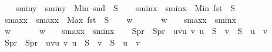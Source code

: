 \begin{isabellebody}
\isanewline
\ \ \isamarkupfalse%
\ s{}{\isacharunderscore}{\kern0pt}miny\ \ {\isachardoublequoteopen}s{}{\isacharunderscore}{\kern0pt}miny\ {\isacharequal}{\kern0pt}\ Min\ {\isacharparenleft}{\kern0pt}snd\ {\isacharbackquote}{\kern0pt}\ S{}{\isacharparenright}{\kern0pt}{\isachardoublequoteclose}\isanewline
\ \ \isamarkupfalse%
\ s{}{\isacharunderscore}{\kern0pt}minx\ \ {\isachardoublequoteopen}s{}{\isacharunderscore}{\kern0pt}minx\ {\isacharequal}{\kern0pt}\ Min\ {\isacharparenleft}{\kern0pt}fst\ {\isacharbackquote}{\kern0pt}\ S{}{\isacharparenright}{\kern0pt}{\isachardoublequoteclose}\isanewline
\ \ \isamarkupfalse%
\ s{}{\isacharunderscore}{\kern0pt}maxx\ \ {\isachardoublequoteopen}s{}{\isacharunderscore}{\kern0pt}maxx\ {\isacharequal}{\kern0pt}\ Max\ {\isacharparenleft}{\kern0pt}fst\ {\isacharbackquote}{\kern0pt}\ S{}{\isacharparenright}{\kern0pt}{\isachardoublequoteclose}\isanewline
\ \ \isamarkupfalse%
\ w{}\ \ \ \ \ \ \ {\isachardoublequoteopen}w{}\ \ \ {\isacharequal}{\kern0pt}\ s{}{\isacharunderscore}{\kern0pt}maxx\ {\isacharminus}{\kern0pt}\ s{}{\isacharunderscore}{\kern0pt}minx{\isachardoublequoteclose}\isanewline
\ \ \isamarkupfalse%
\ w{}\ \ \ \ \ \ \ {\isachardoublequoteopen}w{}\ \ \ {\isacharequal}{\kern0pt}\ s{}{\isacharunderscore}{\kern0pt}maxx\ {\isacharminus}{\kern0pt}\ s{}{\isacharunderscore}{\kern0pt}minx{\isachardoublequoteclose}\isanewline
\isanewline
\ \ \isamarkupfalse%
\ S{}pr\ \ {\isachardoublequoteopen}S{}pr\ {\isacharequal}{\kern0pt}\ {\isacharbraceleft}{\kern0pt}{\isacharparenleft}{\kern0pt}u{\isacharcomma}{\kern0pt}v{\isacharparenright}{\kern0pt}{\isacharbar}{\kern0pt}u\ v{\isachardot}{\kern0pt}\ u\ {\isasymin}\ S{}\ {\isasymand}\ v\ {\isasymin}\ S{}\ {\isasymand}\ u\ {\isacharless}{\kern0pt}\ v{\isacharbraceright}{\kern0pt}{\isachardoublequoteclose}\isanewline
\ \ \isamarkupfalse%
\ S{}pr\ \ {\isachardoublequoteopen}S{}pr\ {\isacharequal}{\kern0pt}\ {\isacharbraceleft}{\kern0pt}{\isacharparenleft}{\kern0pt}u{\isacharcomma}{\kern0pt}v{\isacharparenright}{\kern0pt}{\isacharbar}{\kern0pt}u\ v{\isachardot}{\kern0pt}\ u\ {\isasymin}\ S{}\ {\isasymand}\ v\ {\isasymin}\ S{}\ {\isasymand}\ u\ {\isacharless}{\kern0pt}\ v{\isacharbraceright}{\kern0pt}{\isachardoublequoteclose}\isanewline

\end{isabellebody}

